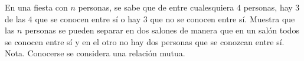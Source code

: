 En una fiesta con $n$ personas, se sabe que de entre cualesquiera $4$ personas, hay $3$ de las
$4$ que se conocen entre sí o hay $3$ que no se conocen entre sí. Muestra que las $n$ personas
se pueden separar en dos salones de manera que en un salón todos se conocen entre sí y
en el otro no hay dos personas que se conozcan entre sí.
Nota. Conocerse se considera una relación mutua.